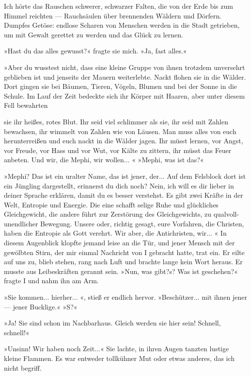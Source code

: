 Ich hörte das Rauschen schwerer, schwarzer Falten, die von der Erde
bis zum Himmel reichten — Rauchsäulen über brennenden Wäldern und
Dörfern. Dumpfes Getöse: endlose Scharen von Menschen werden in die
Stadt getrieben, um mit Gewalt gerettet zu werden und das Glück zu
lernen.

»Hast du das alles gewusst?« fragte sie mich. »Ja, fast alles.«

»Aber du wusstest nicht, dass eine kleine Gruppe von ihnen trotzdem
unversehrt geblieben ist und jenseits der Mauern weiterlebte. Nackt
flohen sie in die Wälder. Dort gingen sie bei Bäumen, Tieren,
Vögeln, Blumen und bei der Sonne in die Schule. Im Lauf der Zeit
bedeckte sich ihr Körper mit Haaren, aber unter diesem Fell
bewahrten

sie ihr heißes, rotes Blut. Ihr seid viel schlimmer als sie, ihr
seid mit Zahlen bewachsen, ihr wimmelt von Zahlen wie von Läusen.
Man muss alles von euch herunterreißen und euch nackt in die Wälder
jagen. Ihr müsst lernen, vor Angst, vor Freude, vor Hass und vor
Wut, vor Kälte zu zittern, ihr müsst das Feuer anbeten. Und wir,
die Mephi, wir wollen... « »Mephi, was ist das?«

»Mephi? Das ist ein uralter Name, das ist jener, der... Auf dem
Felsblock dort ist ein Jüngling dargestellt, erinnerst du dich
noch? Nein, ich will es dir lieber in deiner Sprache erklären,
damit du es besser verstehst. Es gibt zwei Kräfte in der Welt,
Entropie und Energie. Die eine schafft selige Ruhe und glückliches
Gleichgewicht, die andere führt zur Zerstörung des Gleichgewichts,
zu qualvoll-unendlicher Bewegung. Unsere oder, richtig gesagt, eure
Vorfahren, die Christen, haben die Entropie als Gott verehrt. Wir
aber, die Antichristen, wir... « In diesem Augenblick klopfte
jemand leise an die Tür, und jener Mensch mit der gewölbten Stirn,
der mir einmal Nachricht von I gebracht hatte, trat ein. Er eilte
auf uns zu, blieb stehen, rang nach Luft und brachte lange kein
Wort heraus. Er musste aus Leibeskräften gerannt sein. »Nun, was
gibt?s? Was ist geschehen?« fragte I und nahm ihn am Arm.

»Sie kommen... hierher... «, stieß er endlich hervor.
»Beschützer... mit ihnen jener — jener Bucklige.« »S?«

»Ja! Sie sind schon im Nachbarhaus. Gleich werden sie hier sein!
Schnell, schnell!«

»Unsinn! Wir haben noch Zeit...« Sie lachte, in ihren Augen tanzten
lustige kleine Flammen. Es war entweder tollkühner Mut oder etwas
anderes, das ich nicht begriff.

